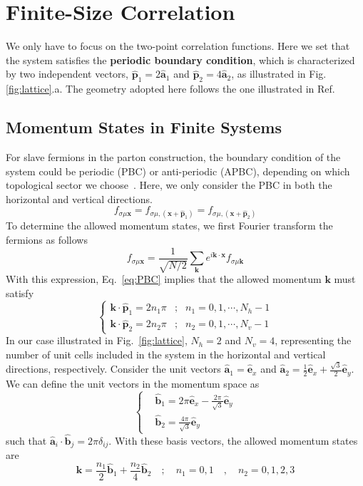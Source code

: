 \documentclass[12font]{article}
\numberwithin{equation}{section}    %
\theoremstyle{definition}
\newcommand{\bo}[1]{\mathbf{#1}}
\begin{document}
\section{Finite-Size Correlation}
We only have to focus on the two-point correlation functions. Here we set that the system satisfies the \textbf{periodic boundary condition}, which is characterized by two independent vectors, $\hat{\bo{p}}_1 = 2\hat{\bo{a}}_1$ and $\hat{\bo{p}}_2 = 4\hat{\bo{a}}_2$, as illustrated in Fig.\ref{fig:lattice}.a. The geometry adopted here follows the one illustrated in Ref.~\cite{Pedrocchi-Chesi-Loss_2011}

\subsection{Momentum States in Finite Systems}
For slave fermions in the parton construction, the boundary condition of the system could be periodic (PBC) or anti-periodic (APBC), depending on which topological sector we choose~\cite{Kou-Levin-Wen_2008}. Here, we only consider the PBC in both the horizontal and vertical directions. 
\begin{equation}\label{eq:PBC}
    f_{\sigma\mu\bo{x}} = f_{\sigma\mu,(\bo{x} + \hat{\bo{p}}_1)} = f_{\sigma\mu,(\bo{x} + \hat{\bo{p}}_2)}
\end{equation}
To determine the allowed momentum states, we first Fourier transform the fermions as follows
\[
f_{\sigma\mu\bo{x}} = \frac{1}{\sqrt{N/2}}\sum_{\bo{k}} e^{i\bo{k}\cdot\bo{x}} f_{\sigma\mu\bo{k}}
\]
With this expression, Eq.~\eqref{eq:PBC} implies that the allowed momentum $\bo{k}$ must satisfy
\begin{equation}\label{eq:condition-init}
    \left\{
    \begin{array}{lll}
        \bo{k}\cdot\hat{\bo{p}}_1 = 2n_1\pi & ; & n_1 = 0,1,\cdots,N_h-1\\
        \bo{k}\cdot\hat{\bo{p}}_2 = 2n_2\pi & ; & n_2 = 0,1,\cdots,N_v-1
    \end{array}
    \right.
\end{equation}
In our case illustrated in Fig.~\ref{fig:lattice}, $N_h=2$ and $N_v = 4$, representing the number of unit cells included in the system in the horizontal and vertical directions, respectively. Consider the unit vectors $\hat{\bo{a}}_1 = \hat{\bo{e}}_x$ and $\hat{\bo{a}}_2 = \frac{1}{2}\hat{\bo{e}}_x + \frac{\sqrt{3}}{2}\hat{\bo{e}}_y$. We can define the unit vectors in the momentum space as 
\[
\left\{
\begin{aligned}
& \hat{\bo{b}}_1 =  2\pi\hat{\bo{e}}_x - \frac{2\pi}{\sqrt{3}}\hat{\bo{e}}_y\\
& \hat{\bo{b}}_2 = \frac{4\pi}{\sqrt{3}}\hat{\bo{e}}_y
\end{aligned}
\right.
\]
such that $\hat{\bo{a}}_i\cdot\hat{\bo{b}}_j = 2\pi \delta_{ij}$. With these basis vectors, the allowed momentum states are
\begin{equation}\label{eq:allowed-momentum}
    \bo{k} = \frac{n_1}{2}\hat{\bo{b}}_1 + \frac{n_2}{4}\hat{\bo{b}}_2 \quad ; \quad n_1=0,1 \quad,\quad n_2=0,1,2,3
\end{equation}
\end{document}
